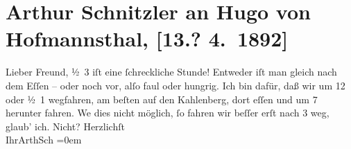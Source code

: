 

         
         \renewcommand{\erwaehntePersonen}{Personen: Hugo von Hofmannsthal}
         \renewcommand{\erwaehnteOrte}{Orte: Kahlenberg, Wien}
         \renewcommand{\erwaehnteWerke}{}
               \section[Arthur Schnitzler an Hugo von Hofmannsthal, {[}13.? 4. 1892{]}]{ Arthur Schnitzler an Hugo von Hofmannsthal, {[}13.? 4. 1892{]}}\nopagebreak{}\rehead{ }\begin{ledgroupsized}[t]{13cm}\normalsize\beginnumbering \toendnotes[C]{\smallbreak\pagebreak[2]} 
\pstart{}{\pb}Lieber Freund,\pend\pstart
           ½ 3 iſt eine ſchreckliche Stunde! Entweder iſt man gleich nach dem Eſſen
               – oder noch vor, alſo faul oder hungrig. Ich bin dafür, daß wir um 12
               oder ½ 1 wegfahren, am beſten auf den Kahlenberg, {\pb}dort eſſen und um 7
               herunter fahren. We{\geminationn} dies nicht möglich, ſo fahren wir
               beſſer erſt nach 3 weg, glaub’ ich. Nicht?\pend
           \pstart
           Herzlichſt{\\[\baselineskip]}Ihr\spacefill\mbox{ArthSch}\pend
           \leftskip=0em{}
         
         \endnumbering{}\end{ledgroupsized}  \newcommand{\dateiname}{L00094}\newcommand{\titel}{Arthur Schnitzler an Hugo von Hofmannsthal, [13.? 4. 1892]}\newcommand{\editorInnen}{Martin Anton Müller und Gerd-Hermann Susen}
      
